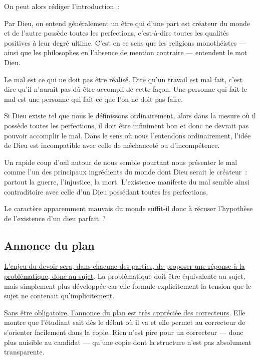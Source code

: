 \documentclass[a4paper,12pt]{article}
\begin{document}
\noindent On peut alors rédiger l'introduction :

\begin{QUOTATION}
Par Dieu, on entend généralement un être qui
d'une part est créateur du monde et de l'autre possède toutes les
perfections, c'est-à-dire toutes les qualités positives à leur degré
ultime. C'est en ce sens que les religions monothéistes — ainsi que
les philosophes en l'absence de mention contraire — entendent le mot
Dieu.

Le mal est ce qui ne doit pas être réalisé. Dire qu'un travail est mal
fait, c'est dire qu'il n'aurait pas dû être accompli de cette façon.
Une personne qui fait le mal est une personne qui fait ce que l'on ne
doit pas faire. 

Si Dieu existe tel que nous le définissons
ordinairement, alors dans la mesure où il possède toutes les
perfections, il doit être infiniment bon et donc ne devrait pas
pouvoir accomplir le mal. Dans le sens où nous l'entendons
ordinairement, l'idée de Dieu est incompatible avec celle de
méchanceté ou d'incompétence.

Un rapide coup d'œil autour de nous semble
pourtant nous présenter le mal comme l'un des principaux ingrédients
du monde dont Dieu serait le créateur : partout la guerre,
l'injustice, la mort. L'existence manifeste du mal semble ainsi
contraditoire avec celle d'un Dieu possédant toutes les perfections.

Le caractère apparemment mauvais du monde
suffit-il donc à récuser l'hypothèse de l'existence d'un dieu
parfait ?
\end{QUOTATION}



\subsection{Annonce du plan}
\label{sec:orgecdca7b}
\label{org55b5fe8}

\uline{L'enjeu du devoir sera, dans chacune des parties, de proposer une
réponse à la problématique, donc au sujet}. La problématique doit être
équivalente au sujet, mais simplement plus développée car elle formule
explicitement la tension que le sujet ne contenait qu'implicitement.


\uline{Sans être obligatoire, l'annonce du plan est très appréciée des
correcteurs}. Elle montre que l'étudiant sait dès le début où il va et
elle permet au correcteur de s'orienter facilement dans la copie. Rien
n'est pire pour un correcteur — donc plus nuisible au candidat — qu'une
copie dont la structure n'est pas absolument transparente.
\end{document}
